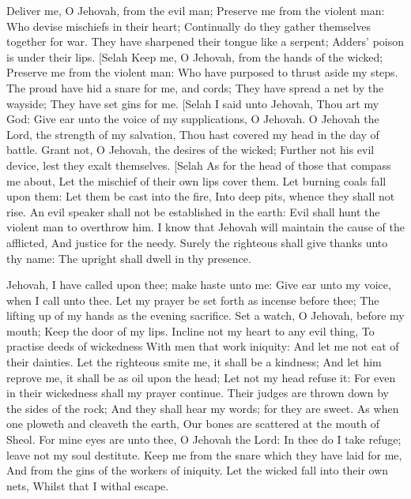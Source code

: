 Deliver me, O Jehovah, from the evil man; Preserve me from the violent man:  Who devise mischiefs in their heart; Continually do they gather themselves together for war.  They have sharpened their tongue like a serpent; Adders’ poison is under their lips. [Selah  Keep me, O Jehovah, from the hands of the wicked; Preserve me from the violent man: Who have purposed to thrust aside my steps.  The proud have hid a snare for me, and cords; They have spread a net by the wayside; They have set gins for me. [Selah  I said unto Jehovah, Thou art my God: Give ear unto the voice of my supplications, O Jehovah.  O Jehovah the Lord, the strength of my salvation, Thou hast covered my head in the day of battle.  Grant not, O Jehovah, the desires of the wicked; Further not his evil device, lest they exalt themselves. [Selah  As for the head of those that compass me about, Let the mischief of their own lips cover them.  Let burning coals fall upon them: Let them be cast into the fire, Into deep pits, whence they shall not rise.  An evil speaker shall not be established in the earth: Evil shall hunt the violent man to overthrow him.  I know that Jehovah will maintain the cause of the afflicted, And justice for the needy.  Surely the righteous shall give thanks unto thy name: The upright shall dwell in thy presence. 

Jehovah, I have called upon thee; make haste unto me: Give ear unto my voice, when I call unto thee.  Let my prayer be set forth as incense before thee; The lifting up of my hands as the evening sacrifice.  Set a watch, O Jehovah, before my mouth; Keep the door of my lips.  Incline not my heart to any evil thing, To practise deeds of wickedness With men that work iniquity: And let me not eat of their dainties.  Let the righteous smite me, it shall be a kindness; And let him reprove me, it shall be as oil upon the head; Let not my head refuse it: For even in their wickedness shall my prayer continue.  Their judges are thrown down by the sides of the rock; And they shall hear my words; for they are sweet.  As when one ploweth and cleaveth the earth, Our bones are scattered at the mouth of Sheol.  For mine eyes are unto thee, O Jehovah the Lord: In thee do I take refuge; leave not my soul destitute.  Keep me from the snare which they have laid for me, And from the gins of the workers of iniquity.  Let the wicked fall into their own nets, Whilst that I withal escape. 

